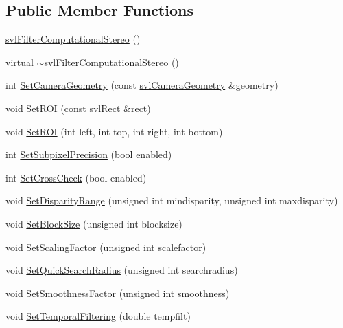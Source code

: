 \subsection*{Public Member Functions}
\begin{DoxyCompactItemize}
\item 
\hyperlink{classsvl_filter_computational_stereo_a081922641ecef34bd94e02ce4e2936e1}{svl\+Filter\+Computational\+Stereo} ()
\item 
virtual \hyperlink{classsvl_filter_computational_stereo_a6a64a4a64ad148a72f1db89b55510089}{$\sim$svl\+Filter\+Computational\+Stereo} ()
\item 
int \hyperlink{classsvl_filter_computational_stereo_afc1156eba6d31b60e38b4125e7b9a116}{Set\+Camera\+Geometry} (const \hyperlink{classsvl_camera_geometry}{svl\+Camera\+Geometry} \&geometry)
\item 
void \hyperlink{classsvl_filter_computational_stereo_aaffffd3927a1d6a50253a9919f58e7be}{Set\+R\+O\+I} (const \hyperlink{structsvl_rect}{svl\+Rect} \&rect)
\item 
void \hyperlink{classsvl_filter_computational_stereo_a6475ff98b13cf889467380bd8a613da6}{Set\+R\+O\+I} (int left, int top, int right, int bottom)
\item 
int \hyperlink{classsvl_filter_computational_stereo_a8e41efd4a553cbbd69256bfef402ae53}{Set\+Subpixel\+Precision} (bool enabled)
\item 
int \hyperlink{classsvl_filter_computational_stereo_a36417f28b59f8c1753a507f5102f6814}{Set\+Cross\+Check} (bool enabled)
\item 
void \hyperlink{classsvl_filter_computational_stereo_a6c708289f92f896fe429db40423b5a87}{Set\+Disparity\+Range} (unsigned int mindisparity, unsigned int maxdisparity)
\item 
void \hyperlink{classsvl_filter_computational_stereo_a45e16a24dba1b25f02199c75897505fc}{Set\+Block\+Size} (unsigned int blocksize)
\item 
void \hyperlink{classsvl_filter_computational_stereo_ac29d5539360f6bdf10976cc5f9a9b067}{Set\+Scaling\+Factor} (unsigned int scalefactor)
\item 
void \hyperlink{classsvl_filter_computational_stereo_adb3e40958080caa04692457663945f03}{Set\+Quick\+Search\+Radius} (unsigned int searchradius)
\item 
void \hyperlink{classsvl_filter_computational_stereo_af11aff403ea39efb9d80dfa543b1bc16}{Set\+Smoothness\+Factor} (unsigned int smoothness)
\item 
void \hyperlink{classsvl_filter_computational_stereo_a52aa5340109acaf4a3148a5144589bdb}{Set\+Temporal\+Filtering} (double tempfilt)

\end{DoxyCompactItemize}
